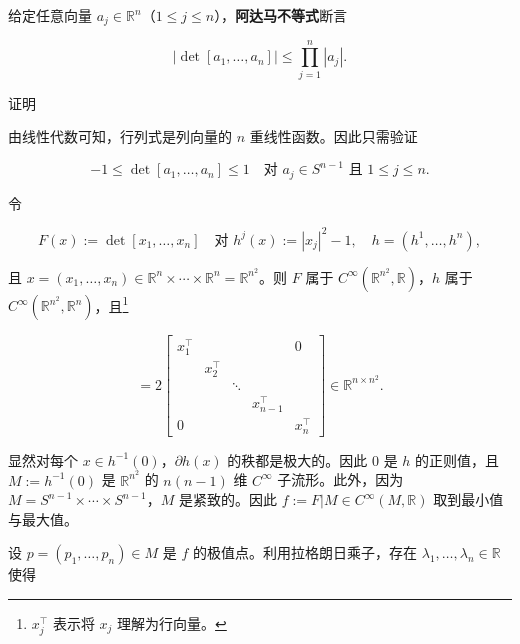 \begin{example}

\begin{items}
\item

给定任意向量 $ a_{j} \in \mathbb{R}^{n} $（$ 1 \le j \le n $），\textbf{阿达马不等式}断言

\[
\left|\det[a_{1}, \ldots, a_{n}]\right| \le \prod_{j=1}^{n}|a_{j}| .
\]

证明

\begin{subitems}
\item

由线性代数可知，行列式是列向量的 $ n $ 重线性函数。因此只需验证

\[
-1 \le \det[a_{1}, \ldots, a_{n}] \le 1 \quad \text{对 } a_{j} \in S^{n-1} \text{ 且 } 1 \le j \le n .
\]
\item

令

\[
F(x) := \det[x_{1}, \ldots, x_{n}] \quad \text{对 } h^{j}(x) := |x_{j}|^{2} - 1 , \quad h = (h^{1}, \ldots, h^{n}) ,
\]

且 $ x = (x_{1}, \ldots, x_{n}) \in \mathbb{R}^{n}\times\cdots\times\mathbb{R}^{n} = \mathbb{R}^{n^{2}} $。则 $ F $ 属于 $ C^{\infty}(\mathbb{R}^{n^{2}},\mathbb{R}) $，$ h $ 属于 $ C^{\infty}(\mathbb{R}^{n^{2}},\mathbb{R}^{n}) $，且\footnote{$ x_{j}^{\top} $ 表示将 $ x_{j} $ 理解为行向量。}

\begin{equation*}
[\partial h(x)] = 2\begin{bmatrix} x_{1}^{\top} & & & & 0 \\ & x_{2}^{\top} & & & \\ & & \ddots & & \\ & & & x_{n-1}^{\top} & \\ 0 & & & & x_{n}^{\top} \end{bmatrix} \in \mathbb{R}^{n\times n^{2}} .
\end{equation*}

显然对每个 $ x \in h^{-1}(0) $，$ \partial h(x) $ 的秩都是极大的。因此 0 是 $ h $ 的正则值，且 $ M := h^{-1}(0) $ 是 $ \mathbb{R}^{n^{2}} $ 的 $ n(n-1) $ 维 $ C^{\infty} $ 子流形。此外，因为 $ M = S^{n-1}\times\cdots\times S^{n-1} $，$ M $ 是紧致的。因此 $ f := F|M \in C^{\infty}(M,\mathbb{R}) $ 取到最小值与最大值。

\item

设 $ p = (p_{1}, \ldots, p_{n}) \in M $ 是 $ f $ 的极值点。利用拉格朗日乘子，存在 $ \lambda_{1}, \ldots, \lambda_{n} \in \mathbb{R} $ 使得


\end{subitems}
\end{items}
\end{example}
